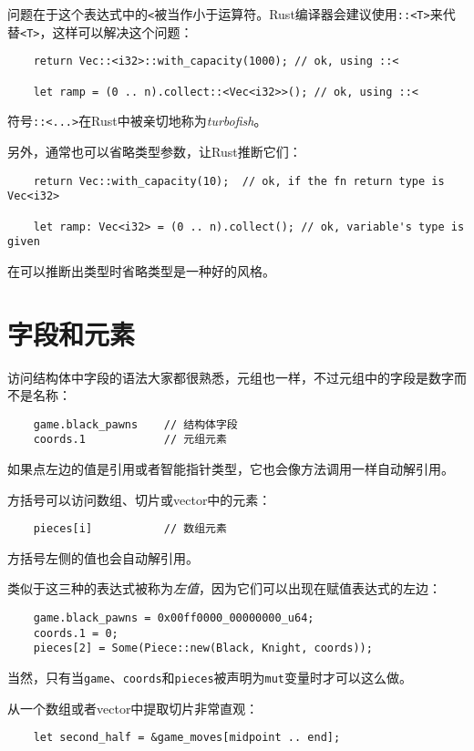 问题在于这个表达式中的\texttt{<}被当作小于运算符。Rust编译器会建议使用\texttt{::<T>}来代替\texttt{<T>}，这样可以解决这个问题：
\begin{verbatim}
    return Vec::<i32>::with_capacity(1000); // ok, using ::<

    let ramp = (0 .. n).collect::<Vec<i32>>(); // ok, using ::<
\end{verbatim}

符号\texttt{::<...>}在Rust中被亲切地称为\emph{turbofish}。

另外，通常也可以省略类型参数，让Rust推断它们：
\begin{verbatim}
    return Vec::with_capacity(10);  // ok, if the fn return type is Vec<i32>

    let ramp: Vec<i32> = (0 .. n).collect(); // ok, variable's type is given
\end{verbatim}

在可以推断出类型时省略类型是一种好的风格。

\section{字段和元素}\label{field}

访问结构体中字段的语法大家都很熟悉，元组也一样，不过元组中的字段是数字而不是名称：
\begin{verbatim}
    game.black_pawns    // 结构体字段
    coords.1            // 元组元素
\end{verbatim}

如果点左边的值是引用或者智能指针类型，它也会像方法调用一样自动解引用。

方括号可以访问数组、切片或vector中的元素：
\begin{verbatim}
    pieces[i]           // 数组元素
\end{verbatim}

方括号左侧的值也会自动解引用。

类似于这三种的表达式被称为\emph{左值}，因为它们可以出现在赋值表达式的左边：
\begin{verbatim}
    game.black_pawns = 0x00ff0000_00000000_u64;
    coords.1 = 0;
    pieces[2] = Some(Piece::new(Black, Knight, coords));
\end{verbatim}

当然，只有当\texttt{game}、\texttt{coords}和\texttt{pieces}被声明为\texttt{mut}变量时才可以这么做。

从一个数组或者vector中提取切片非常直观：
\begin{verbatim}
    let second_half = &game_moves[midpoint .. end];
\end{verbatim}

